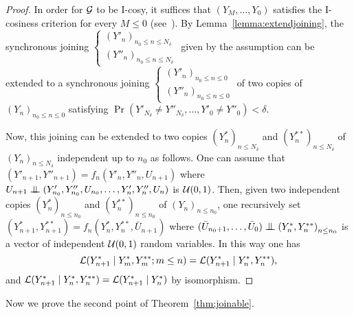 \documentclass[12pt,a4paper]{article}
\begin{document}
\begin{proof}
In order for $\mathcal{G}$ to be I-cosy, it suffices that 
$(Y_M, \ldots, Y_0)$ satisfies the I-cosiness criterion 
for every $M \leq 0$  (see~\cite{LauXLIII}). 
By Lemma~\ref{lemma:extendjoining}, 
the synchronous joining $\left\{\begin{smallmatrix} {(Y'_n)}_{n_0 \leq n \leq N_\delta} \\ 
{(Y''_n)}_{n_0 \leq n \leq N_\delta}
\end{smallmatrix}\right.$ given by the assumption can be extended 
to a synchronous joining 
$\left\{\begin{smallmatrix} {(Y'_n)}_{n_0 \leq n \leq 0} \\ 
{(Y''_n)}_{n_0 \leq n \leq 0}
\end{smallmatrix}\right.$ of two copies of ${(Y_n)}_{n_0 \leq n \leq 0}$ 
satisfying 
$\Pr(Y'_{N_\delta} \neq Y''_{N_\delta}, \ldots, Y'_0 \neq Y''_0) < \delta$. 

Now, this joining can be extended 
to two copies ${(Y^*_n)}_{n \leq N_\delta}$ and ${(Y^{**}_n)}_{n \leq N_\delta}$ 
of ${(Y_n)}_{n \leq N_\delta}$ independent up to $n_0$ as follows. 
One can assume that $(Y'_{n+1}, Y''_{n+1}) = f_n(Y'_n, Y''_n, U_{n+1})$ 
where $U_{n+1} \indep (Y'_{n_0}, Y''_{n_0}, U_{n_0}, \ldots, Y'_n, Y''_n, U_n)$ 
is $\mathcal{U}(0,1)$. 
Then, given two independent copies 
${(Y^*_n)}_{n \leq n_0}$ and ${(Y^{**}_n)}_{n \leq n_0}$ 
of ${(Y_n)}_{n \leq n_0}$, one  recursively set  
$(Y^*_{n+1}, Y^{**}_{n+1}) = f_n(Y^*_n, Y^{**}_n, \bar U_{n+1})$ where 
$(\bar U_{n_0+1}, \ldots, \bar U_{0}) \indep {(Y^*_n, Y^{**}_n)}_{n \leq n_0}$ 
is a vector of independent $\mathcal{U}(0,1)$ random variables.   
In this way one has 
$$
\mathcal{L}(Y^*_{n+1} \mid Y^*_m, Y^{**}_m ; m \leq n) = 
\mathcal{L}(Y^*_{n+1} \mid Y^*_n, Y^{**}_n),
$$
and $\mathcal{L}(Y^*_{n+1} \mid Y^*_n, Y^{**}_n)=\mathcal{L}(Y^*_{n+1} \mid Y^*_n)$ 
by isomorphism. 
\end{proof}


Now we  prove the second point of Theorem~\ref{thm:joinable}.
\end{document}
